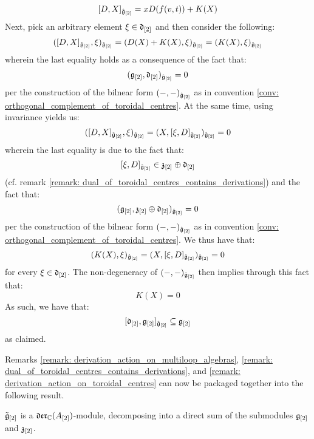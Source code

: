 \begin{remark}
\begin{enumerate}
                    $$[ D, X ]_{\hat{\mathfrak{g}}_{[2]}} = x D( f(v, t) ) + K(X)$$
                Next, pick an arbitrary element $\xi \in \mathfrak{d}_{[2]}$ and then consider the following:
                    $$( [ D, X ]_{\hat{\mathfrak{g}}_{[2]}}, \xi )_{\hat{\mathfrak{g}}_{[2]}} = (D(X) + K(X), \xi)_{\hat{\mathfrak{g}}_{[2]}} = (K(X), \xi)_{\hat{\mathfrak{g}}_{[2]}}$$
                wherein the last equality holds as a consequence of the fact that:
                    $$( \mathfrak{g}_{[2]}, \mathfrak{d}_{[2]} )_{\hat{\mathfrak{g}}_{[2]}} = 0$$
                per the construction of the bilnear form $(-, -)_{\hat{\mathfrak{g}}_{[2]}}$ as in convention \ref{conv: orthogonal_complement_of_toroidal_centres}. At the same time, using invariance yields us:
                    $$( [ D, X ]_{\hat{\mathfrak{g}}_{[2]}}, \xi )_{\hat{\mathfrak{g}}_{[2]}} = (X, [\xi, D]_{\hat{\mathfrak{g}}_{[2]}})_{\hat{\mathfrak{g}}_{[2]}} = 0$$
                wherein the last equality is due to the fact that:
                    $$[\xi, D]_{\hat{\mathfrak{g}}_{[2]}} \in \mathfrak{z}_{[2]} \oplus \mathfrak{d}_{[2]}$$
                (cf. remark \ref{remark: dual_of_toroidal_centres_contains_derivations}) and the fact that:
                    $$( \mathfrak{g}_{[2]}, \mathfrak{z}_{[2]} \oplus \mathfrak{d}_{[2]} )_{\hat{\mathfrak{g}}_{[2]}} = 0$$
                per the construction of the bilnear form $(-, -)_{\hat{\mathfrak{g}}_{[2]}}$ as in convention \ref{conv: orthogonal_complement_of_toroidal_centres}. We thus have that:
                    $$(K(X), \xi)_{\hat{\mathfrak{g}}_{[2]}} = (X, [\xi, D]_{\hat{\mathfrak{g}}_{[2]}})_{\hat{\mathfrak{g}}_{[2]}} = 0$$
                for every $\xi \in \mathfrak{d}_{[2]}$. The non-degeneracy of $(-, -)_{\hat{\mathfrak{g}}_{[2]}}$ then implies through this fact that:
                    $$K(X) = 0$$
                As such, we have that:
                    $$[ \mathfrak{d}_{[2]}, \mathfrak{g}_{[2]} ]_{\hat{\mathfrak{g}}_{[2]}} \subseteq \mathfrak{g}_{[2]}$$
                as claimed. 
            \end{enumerate}

        \end{remark}

        Remarks \ref{remark: derivation_action_on_multiloop_algebras}, \ref{remark: dual_of_toroidal_centres_contains_derivations}, and \ref{remark: derivation_action_on_toroidal_centres} can now be packaged together into the following result.
        \begin{proposition} \label{prop: toroidal_lie_algebras_as_modules_over_vector_field_lie_algebras}
            $\tilde{\mathfrak{g}}_{[2]}$ is a $\mathfrak{der}_{\mathbb{C}}(A_{[2]})$-module, decomposing into a direct sum of the submodules $\mathfrak{g}_{[2]}$ and $\mathfrak{z}_{[2]}$. 
        \end{proposition}

